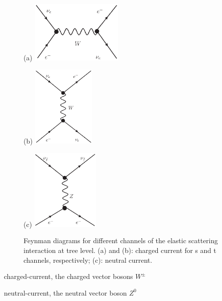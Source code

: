 \begin{figure}[htbp]
	\centering
	\begin{minipage}[t]{0.45\textwidth}{(a)}
		\centering
		\includegraphics[width=4.5cm]{charged-1.eps}
	\end{minipage}
	\begin{minipage}[t]{0.3\textwidth}{(b)}
		\centering
		\includegraphics[height=4cm]{charged.eps}
	\end{minipage}
	\begin{minipage}[t]{0.4\textwidth}{(c)}
		\centering
		\includegraphics[height=4cm]{neutral.eps}
	\end{minipage}
	\caption[Feynman diagrams for different channels of the elastic scattering interaction.]{Feynman diagrams for different channels of the elastic scattering interaction at tree level. (a) and (b): charged current for s and t channels, respectively; (c): neutral current.}
	\label{feynman-es}
\end{figure}

charged-current, the charged vector bosons $W^\pm$ 


neutral-current, the neutral vector boson $Z^0$


